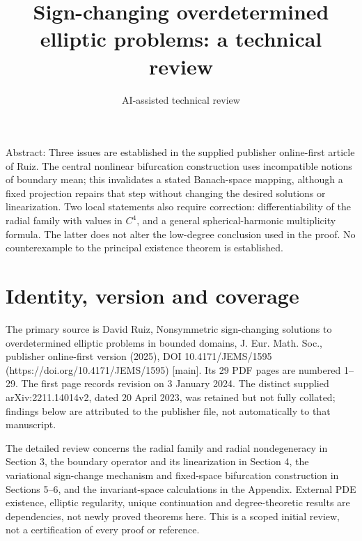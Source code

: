 \documentclass[10pt]{article}
\title{Sign-changing overdetermined elliptic problems: a technical review}
\author{AI-assisted technical review}
\date{}
\begin{document}
\maketitle
Abstract: Three issues are established in the supplied publisher online-first article of Ruiz. The central nonlinear bifurcation construction uses incompatible notions of boundary mean; this invalidates a stated Banach-space mapping, although a fixed projection repairs that step without changing the desired solutions or linearization. Two local statements also require correction: differentiability of the radial family with values in \(C^4\), and a general spherical-harmonic multiplicity formula. The latter does not alter the low-degree conclusion used in the proof. No counterexample to the principal existence theorem is established.\par
\section*{Identity, version and coverage}
The primary source is David Ruiz, Nonsymmetric sign-changing solutions to overdetermined elliptic problems in bounded domains, J. Eur. Math. Soc., publisher online-first version (2025), DOI 10.4171/JEMS/1595 (https://doi.org/10.4171/JEMS/1595) [main]. Its 29 PDF pages are numbered 1–29. The first page records revision on 3 January 2024. The distinct supplied arXiv:2211.14014v2, dated 20 April 2023, was retained but not fully collated; findings below are attributed to the publisher file, not automatically to that manuscript.\par
The detailed review concerns the radial family and radial nondegeneracy in Section 3, the boundary operator and its linearization in Section 4, the variational sign-change mechanism and fixed-space bifurcation construction in Sections 5–6, and the invariant-space calculations in the Appendix. External PDE existence, elliptic regularity, unique continuation and degree-theoretic results are dependencies, not newly proved theorems here. This is a scoped initial review, not a certification of every proof or reference.\par
\end{document}
